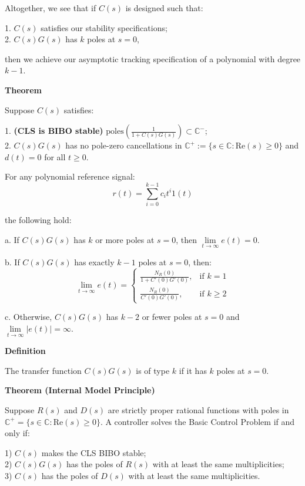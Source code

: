 \documentclass[5pt]{extarticle} %
\begin{document}
\begin{paracol}{3}
{    Altogether, we see that if $C(s)$ is designed such that:

    1. $C(s)$ satisfies our stability specifications; \\
    2. $C(s) G(s)$ has $k$ poles at $s = 0$,

    then we achieve our asymptotic tracking specification of a polynomial with degree $k-1$.

    \textbf{Theorem}

    Suppose $C(s)$ satisfies:

    1. \textbf{(CLS is BIBO stable)} $\text{poles} \left( \frac{1}{1 + C(s) G(s)} \right) \subset \mathbb{C}^{-}$; \\
    2. $C(s) G(s)$ has no pole-zero cancellations in $\mathbb{C}^{+} := \{ s \in \mathbb{C} : \text{Re}(s) \geq 0 \}$ and $d(t) = 0$ for all $t \geq 0$.

    For any polynomial reference signal:
    \[ r(t) = \sum_{i=0}^{k-1} c_i t^i 1(t) \]

    the following hold:

    a. If $C(s) G(s)$ has $k$ or more poles at $s = 0$, then $\lim\limits_{t \to \infty} e(t) = 0$.

    b. If $C(s) G(s)$ has exactly $k-1$ poles at $s = 0$, then:
    \[ \lim\limits_{t \to \infty} e(t) = \begin{cases} \frac{N_R(0)}{1 + C'(0) G'(0)}, & \text{if } k = 1 \\ \frac{N_R(0)}{C'(0) G'(0)}, & \text{if } k \geq 2 \end{cases} \]

    c. Otherwise, $C(s) G(s)$ has $k-2$ or fewer poles at $s = 0$ and $\lim\limits_{t \to \infty} |e(t)| = \infty$.

    \textbf{Definition}

    The transfer function $C(s) G(s)$ is of type $k$ if it has $k$ poles at $s = 0$.

    \textbf{Theorem (Internal Model Principle)}

    Suppose $R(s)$ and $D(s)$ are strictly proper rational functions with poles in $\mathbb{C}^{+} = \{ s \in \mathbb{C} : \text{Re}(s) \geq 0 \}$. A controller solves the Basic Control Problem if and only if:

    1) $C(s)$ makes the CLS BIBO stable; \\
    2) $C(s) G(s)$ has the poles of $R(s)$ with at least the same multiplicities; \\
    3) $C(s)$ has the poles of $D(s)$ with at least the same multiplicities.

}
\end{paracol}
\end{document}
